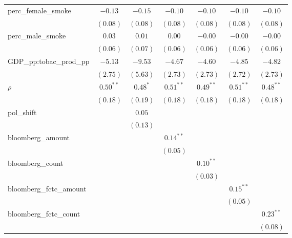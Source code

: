 \begin{table}[!h]
\begin{center}
\begin{tabular}{l c c c c c c }
perc\_female\_smoke     & $-0.13$     & $-0.15$     & $-0.10$     & $-0.10$     & $-0.10$     & $-0.10$     \\
                        & $(0.08)$    & $(0.08)$    & $(0.08)$    & $(0.08)$    & $(0.08)$    & $(0.08)$    \\
perc\_male\_smoke       & $0.03$      & $0.01$      & $0.00$      & $-0.00$     & $-0.00$     & $-0.00$     \\
                        & $(0.06)$    & $(0.07)$    & $(0.06)$    & $(0.06)$    & $(0.06)$    & $(0.06)$    \\
GDP\_pp:tobac\_prod\_pp & $-5.13$     & $-9.53$     & $-4.67$     & $-4.60$     & $-4.85$     & $-4.82$     \\
                        & $(2.75)$    & $(5.63)$    & $(2.73)$    & $(2.73)$    & $(2.72)$    & $(2.73)$    \\
$\rho$                  & $0.50^{**}$ & $0.48^{*}$  & $0.51^{**}$ & $0.49^{**}$ & $0.51^{**}$ & $0.48^{**}$ \\
                        & $(0.18)$    & $(0.19)$    & $(0.18)$    & $(0.18)$    & $(0.18)$    & $(0.18)$    \\
pol\_shift              &             & $0.05$      &             &             &             &             \\
                        &             & $(0.13)$    &             &             &             &             \\
bloomberg\_amount       &             &             & $0.14^{**}$ &             &             &             \\
                        &             &             & $(0.05)$    &             &             &             \\
bloomberg\_count        &             &             &             & $0.10^{**}$ &             &             \\
                        &             &             &             & $(0.03)$    &             &             \\
bloomberg\_fctc\_amount &             &             &             &             & $0.15^{**}$ &             \\
                        &             &             &             &             & $(0.05)$    &             \\
bloomberg\_fctc\_count  &             &             &             &             &             & $0.23^{**}$ \\
                        &             &             &             &             &             & $(0.08)$    \\

\end{tabular}
\end{center}
\end{table}
